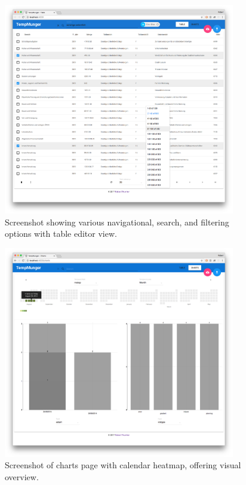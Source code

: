 \begin{figure}
  \centering
  \includegraphics[width=0.9\textwidth]{figures/implementation/screenshot-search+filtering}
  \caption{Screenshot showing various navigational, search, and filtering options with table editor view.}
  \label{fig:screenshot-search+filtering}
\end{figure}

\begin{figure}[h]
  \centering
  \includegraphics[width=0.9\textwidth]{figures/implementation/screenshot-charts-page}
  \caption{Screenshot of charts page with calendar heatmap, offering visual overview.}
  \label{fig:screenshot-charts-page}
\end{figure}

